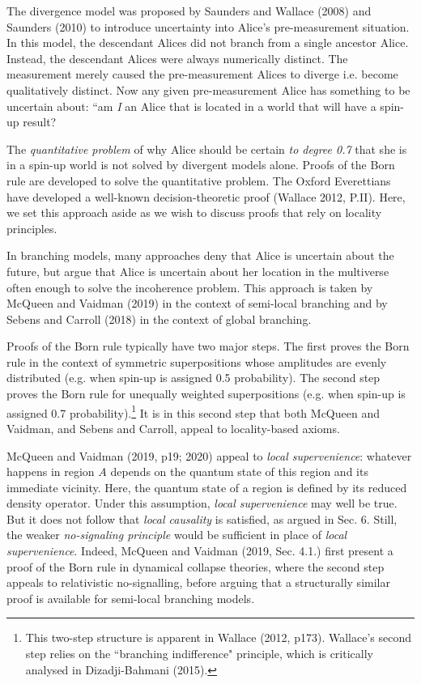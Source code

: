 \documentclass[a4paper]{article}
\begin{document}
The divergence model was proposed by Saunders and Wallace (2008) and Saunders (2010) to introduce uncertainty into Alice's pre-measurement situation. In this model, the descendant Alices did not branch from a single ancestor Alice. Instead, the descendant Alices were always numerically distinct. The measurement merely caused the pre-measurement Alices to diverge i.e. become qualitatively distinct. Now any given pre-measurement Alice has something to be uncertain about: ``am \textit{I} an Alice that is located in a world that will have a spin-up result? 

The \textit{quantitative problem} of why Alice should be certain \textit{to degree 0.7} that she is in a spin-up world is not solved by divergent models alone. Proofs of the Born rule are developed to solve the quantitative problem. The Oxford Everettians have developed a well-known decision-theoretic proof (Wallace 2012, P.II). Here, we set this approach aside as we wish to discuss proofs that rely on locality principles.  

In branching models, many approaches deny that Alice is uncertain about the future, but argue that Alice is uncertain about her location in the multiverse often enough to solve the incoherence problem. This approach is taken by McQueen and Vaidman (2019) in the context of semi-local branching and by Sebens and Carroll (2018) in the context of global branching.

Proofs of the Born rule typically have two major steps. The first proves the Born rule in the context of symmetric superpositions whose amplitudes are evenly distributed (e.g. when spin-up is assigned 0.5 probability). The second step proves the Born rule for unequally weighted superpositions (e.g. when spin-up is assigned 0.7 probability).\footnote{This two-step structure is apparent in Wallace (2012, p173). Wallace's second step relies on the ``branching indifference" principle, which is critically analysed in Dizadji-Bahmani (2015).} It is in this second step that both McQueen and Vaidman, and Sebens and Carroll, appeal to locality-based axioms. 

McQueen and Vaidman (2019, p19; 2020) appeal to \textit{local supervenience}: whatever happens in region $A$ depends on the quantum state of this region and its immediate vicinity. Here, the quantum state of a region is defined by its reduced density operator. Under this assumption, \textit{local supervenience} may well be true. But it does not follow that \textit{local causality} is satisfied, as argued in Sec. 6. Still, the weaker \textit{no-signaling principle} would be sufficient in place of \textit{local supervenience}. Indeed, McQueen and Vaidman (2019, Sec. 4.1.) first present a proof of the Born rule in dynamical collapse theories, where the second step appeals to relativistic no-signalling, before arguing that a structurally similar proof is available for semi-local branching models.
\end{document}
